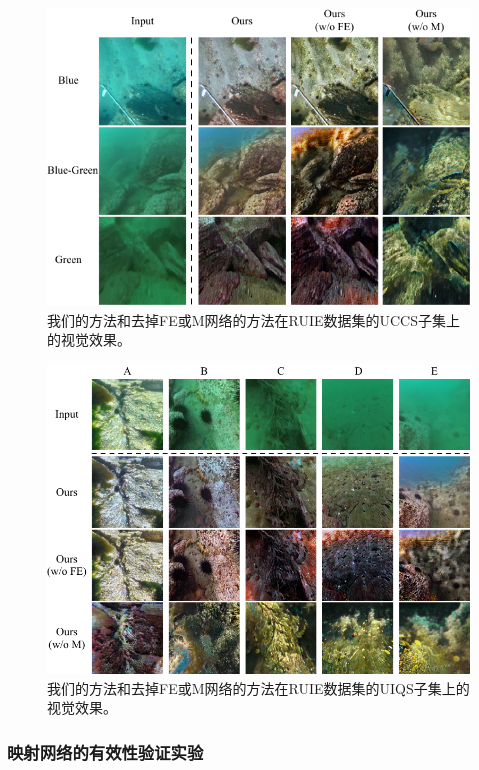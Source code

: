 \begin{figure}[!ht]
    \centering
	\includegraphics[width=\textwidth]{figs/RUIE_UCCS.pdf}
	\caption{我们的方法和去掉FE或M网络的方法在RUIE数据集的UCCS子集上的视觉效果。}
	\label{fig:RUIE_UCCS}
\end{figure}

\begin{figure}[!ht]
    \centering
	\includegraphics[width=\textwidth]{figs/RUIE_UIQS.pdf}
	\caption{我们的方法和去掉FE或M网络的方法在RUIE数据集的UIQS子集上的视觉效果。}
	\label{fig:RUIE_UIQS}
\end{figure}

\subsubsection{映射网络的有效性验证实验}

